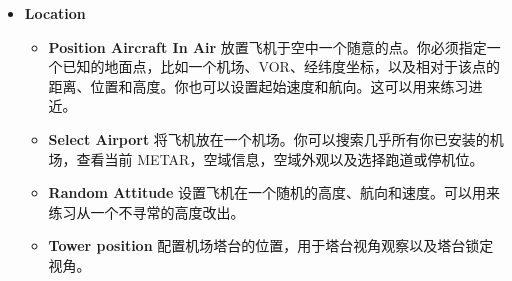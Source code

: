 \begin{itemize}
\ifchinese
\item \textbf{Location}
 \begin{itemize}
   \item \textbf{Position Aircraft In Air} 放置飞机于空中一个随意的点。你必须指定一个已知的地面点，比如一个机场、VOR、经纬度坐标，以及相对于该点的距离、位置和高度。你也可以设置起始速度和航向。这可以用来练习进近。
   \item \textbf{Select Airport} 将飞机放在一个机场。你可以搜索几乎所有你已安装的机场，查看当前 METAR，空域信息，空域外观以及选择跑道或停机位。
   \item \textbf{Random Attitude} 设置飞机在一个随机的高度、航向和速度。可以用来练习从一个不寻常的高度改出。
    \item \textbf{Tower position} 配置机场塔台的位置，用于塔台视角观察以及塔台锁定视角。
\end{itemize}
\fi

{}
\end{itemize}
